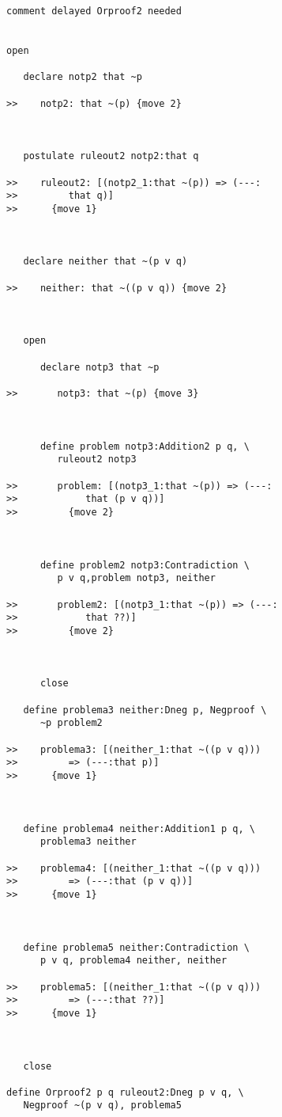 \begin{verbatim}
comment delayed Orproof2 needed


open

   declare notp2 that ~p

>>    notp2: that ~(p) {move 2}



   postulate ruleout2 notp2:that q

>>    ruleout2: [(notp2_1:that ~(p)) => (---:
>>         that q)]
>>      {move 1}



   declare neither that ~(p v q)

>>    neither: that ~((p v q)) {move 2}



   open

      declare notp3 that ~p

>>       notp3: that ~(p) {move 3}



      define problem notp3:Addition2 p q, \
         ruleout2 notp3

>>       problem: [(notp3_1:that ~(p)) => (---:
>>            that (p v q))]
>>         {move 2}



      define problem2 notp3:Contradiction \
         p v q,problem notp3, neither

>>       problem2: [(notp3_1:that ~(p)) => (---:
>>            that ??)]
>>         {move 2}



      close

   define problema3 neither:Dneg p, Negproof \
      ~p problem2

>>    problema3: [(neither_1:that ~((p v q)))
>>         => (---:that p)]
>>      {move 1}



   define problema4 neither:Addition1 p q, \
      problema3 neither

>>    problema4: [(neither_1:that ~((p v q)))
>>         => (---:that (p v q))]
>>      {move 1}



   define problema5 neither:Contradiction \
      p v q, problema4 neither, neither

>>    problema5: [(neither_1:that ~((p v q)))
>>         => (---:that ??)]
>>      {move 1}



   close

define Orproof2 p q ruleout2:Dneg p v q, \
   Negproof ~(p v q), problema5


\end{verbatim}
